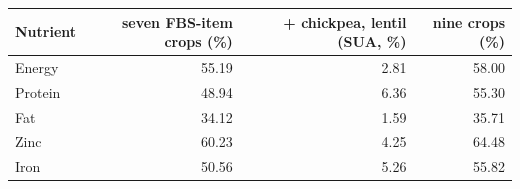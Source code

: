 \begin{tabular}{lrrr}
\toprule
Nutrient & seven FBS-item crops (\%) & + chickpea, lentil (SUA, \%) & nine crops (\%) \\
\midrule
Energy & 55.19 & 2.81 & 58.00 \\
Protein & 48.94 & 6.36 & 55.30 \\
Fat & 34.12 & 1.59 & 35.71 \\
Zinc & 60.23 & 4.25 & 64.48 \\
Iron & 50.56 & 5.26 & 55.82 \\
\bottomrule
\end{tabular}
